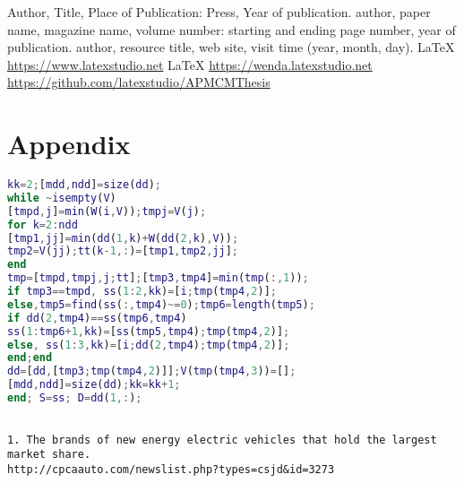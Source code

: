 \documentclass{apmcmthesis}
\begin{document}
\begin{thebibliography}{9}%
 Author, Title, Place of Publication: Press, Year of publication.
 author, paper name, magazine name, volume number: starting and ending
page number, year of publication.
 author, resource title, web site, visit time (year, month, day).
  \LaTeX{} \url{https://www.latexstudio.net}
  \LaTeX{} \url{https://wenda.latexstudio.net}
    \url{https://github.com/latexstudio/APMCMThesis}
\end{thebibliography}

\newpage

\section{Appendix}
\begin{lstlisting}[language=matlab,caption={The matlab Source code of Algorithm}]
kk=2;[mdd,ndd]=size(dd);
while ~isempty(V)
[tmpd,j]=min(W(i,V));tmpj=V(j);
for k=2:ndd
[tmp1,jj]=min(dd(1,k)+W(dd(2,k),V));
tmp2=V(jj);tt(k-1,:)=[tmp1,tmp2,jj];
end
tmp=[tmpd,tmpj,j;tt];[tmp3,tmp4]=min(tmp(:,1));
if tmp3==tmpd, ss(1:2,kk)=[i;tmp(tmp4,2)];
else,tmp5=find(ss(:,tmp4)~=0);tmp6=length(tmp5);
if dd(2,tmp4)==ss(tmp6,tmp4)
ss(1:tmp6+1,kk)=[ss(tmp5,tmp4);tmp(tmp4,2)];
else, ss(1:3,kk)=[i;dd(2,tmp4);tmp(tmp4,2)];
end;end
dd=[dd,[tmp3;tmp(tmp4,2)]];V(tmp(tmp4,3))=[];
[mdd,ndd]=size(dd);kk=kk+1;
end; S=ss; D=dd(1,:);
\end{lstlisting}

\begin{lstlisting}[caption={Data source}]

1. The brands of new energy electric vehicles that hold the largest market share.
http://cpcaauto.com/newslist.php?types=csjd&id=3273

\end{lstlisting}
\end{document}

